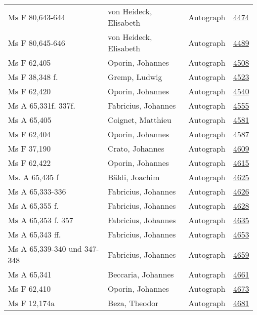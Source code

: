 \documentclass[10pt,a4paper,landscape]{report}
\begin{document}
\begin{longtable}{p{16cm}p{4cm}lr}
Ms F 80,643-644	&	von Heideck, Elisabeth	&	Autograph	&	\href{http://130.60.24.72/assignment/4474}{4474}\\
Ms F 80,645-646	&	von Heideck, Elisabeth	&	Autograph	&	\href{http://130.60.24.72/assignment/4489}{4489}\\
Ms F 62,405	&	Oporin, Johannes	&	Autograph	&	\href{http://130.60.24.72/assignment/4508}{4508}\\
Ms F 38,348 f.	&	Gremp, Ludwig	&	Autograph	&	\href{http://130.60.24.72/assignment/4523}{4523}\\
Ms F 62,420	&	Oporin, Johannes	&	Autograph	&	\href{http://130.60.24.72/assignment/4540}{4540}\\
Ms A 65,331f. 337f.	&	Fabricius, Johannes	&	Autograph	&	\href{http://130.60.24.72/assignment/4555}{4555}\\
Ms A 65,405	&	Coignet, Matthieu	&	Autograph	&	\href{http://130.60.24.72/assignment/4581}{4581}\\
Ms F 62,404	&	Oporin, Johannes	&	Autograph	&	\href{http://130.60.24.72/assignment/4587}{4587}\\
Ms F 37,190	&	Crato, Johannes	&	Autograph	&	\href{http://130.60.24.72/assignment/4609}{4609}\\
Ms F 62,422	&	Oporin, Johannes	&	Autograph	&	\href{http://130.60.24.72/assignment/4615}{4615}\\
Ms. A 65,435 f	&	Bäldi, Joachim	&	Autograph	&	\href{http://130.60.24.72/assignment/4625}{4625}\\
Ms A 65,333-336	&	Fabricius, Johannes	&	Autograph	&	\href{http://130.60.24.72/assignment/4626}{4626}\\
Ms A 65,355 f.	&	Fabricius, Johannes	&	Autograph	&	\href{http://130.60.24.72/assignment/4628}{4628}\\
Ms A 65,353 f. 357	&	Fabricius, Johannes	&	Autograph	&	\href{http://130.60.24.72/assignment/4635}{4635}\\
Ms A 65,343 ff.	&	Fabricius, Johannes	&	Autograph	&	\href{http://130.60.24.72/assignment/4653}{4653}\\
Ms A 65,339-340 und 347-348	&	Fabricius, Johannes	&	Autograph	&	\href{http://130.60.24.72/assignment/4659}{4659}\\
Ms A 65,341	&	Beccaria, Johannes	&	Autograph	&	\href{http://130.60.24.72/assignment/4661}{4661}\\
Ms F 62,410	&	Oporin, Johannes	&	Autograph	&	\href{http://130.60.24.72/assignment/4673}{4673}\\
Ms F 12,174a	&	Beza, Theodor	&	Autograph	&	\href{http://130.60.24.72/assignment/4681}{4681}\\

\end{longtable}
\end{document}
